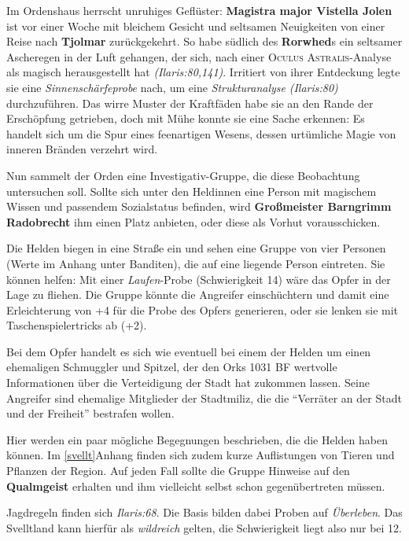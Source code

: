 Im Ordenshaus herrscht unruhiges Geflüster: \textbf{Magistra major Vistella Jolen} ist vor einer Woche mit bleichem Gesicht und seltsamen Neuigkeiten von einer Reise nach \textbf{Tjolmar} zurückgekehrt. So habe südlich des \textbf{Rorwhed}s ein seltsamer Ascheregen in der Luft gehangen, der sich, nach einer \textsc{Oculus Astralis}-Analyse als magisch herausgestellt hat \emph{(Ilaris:80,141)}.
Irritiert von ihrer Entdeckung legte sie eine \emph{Sinnenschärfeprobe} nach, um eine \emph{Strukturanalyse} \emph{(Ilaris:80)} durchzuführen. Das wirre Muster der Kraftfäden habe sie an den Rande der Erschöpfung getrieben, doch mit Mühe konnte sie eine Sache erkennen: Es handelt sich um die Spur eines feenartigen Wesens, dessen urtümliche Magie von inneren Bränden verzehrt wird.

Nun sammelt der Orden eine Investigativ-Gruppe, die diese Beobachtung untersuchen soll.
Sollte sich unter den Heldinnen eine Person mit magischem Wissen und passendem Sozialstatus befinden, wird \textbf{Großmeister Barngrimm Radobrecht} ihm einen Platz anbieten, oder diese als Vorhut vorausschicken.


Die Helden biegen in eine Straße ein und sehen eine Gruppe von vier Personen (Werte im Anhang unter Banditen), die auf eine liegende Person eintreten.
Sie können helfen: Mit einer \emph{Laufen}-Probe (Schwierigkeit 14) wäre das Opfer in der Lage zu fliehen. Die Gruppe könnte die Angreifer einschüchtern und damit eine Erleichterung von +4 für die Probe des Opfers generieren, oder sie lenken sie mit Taschenspielertricks ab (+2).

Bei dem Opfer handelt es sich wie eventuell bei einem der Helden um einen ehemaligen Schmuggler und Spitzel, der den Orks 1031 BF wertvolle Informationen über die Verteidigung der Stadt hat zukommen lassen. Seine Angreifer sind ehemalige Mitglieder der Stadtmiliz, die die \enquote{Verräter an der Stadt und der Freiheit} bestrafen wollen.

\newpage

Hier werden ein paar mögliche Begegnungen beschrieben, die die Helden haben können. Im \ref{svellt}{Anhang} finden sich zudem kurze Auflistungen von Tieren und Pflanzen der Region. Auf jeden Fall sollte die Gruppe Hinweise auf den \textbf{Qualmgeist} erhalten und ihm vielleicht selbst schon gegenübertreten müssen.

Jagdregeln finden sich \emph{Ilaris:68}. Die Basis bilden dabei Proben auf \emph{Überleben}.
Das Svelltland kann hierfür als \emph{wildreich} gelten, die Schwierigkeit liegt also nur bei 12.

